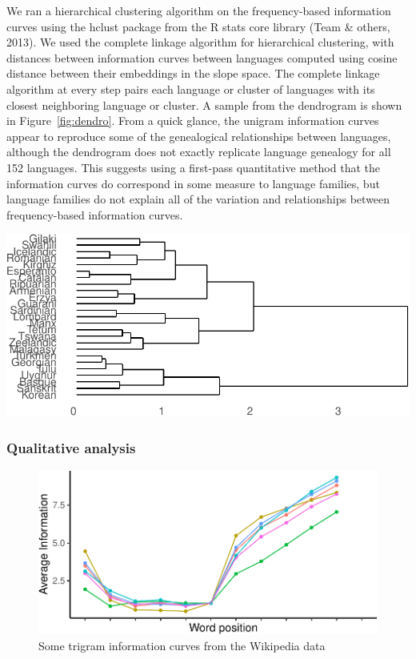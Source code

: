 \documentclass[man,floatsintext]{apa6}
\begin{document}
We ran a hierarchical clustering algorithm on the frequency-based information curves using the hclust package from the R stats core library (Team \& others, 2013). We used the complete linkage algorithm for hierarchical clustering, with distances between information curves between languages computed using cosine distance between their embeddings in the slope space. The complete linkage algorithm at every step pairs each language or cluster of languages with its closest neighboring language or cluster. A sample from the dendrogram is shown in Figure~\ref{fig:dendro}. From a quick glance, the unigram information curves appear to reproduce some of the genealogical relationships between languages, although the dendrogram does not exactly replicate language genealogy for all 152 languages. This suggests using a first-pass quantitative method that the information curves do correspond in some measure to language families, but language families do not explain all of the variation and relationships between frequency-based information curves.

\includegraphics{figs/dendro-1.pdf}

\hypertarget{qualitative-analysis}{%
\subsubsection{Qualitative analysis}\label{qualitative-analysis}}

\begin{figure}
\centering
\includegraphics{figs/wiki-trigrams-1.pdf}
\caption{\label{fig:wiki-trigrams}Some trigram information curves from the Wikipedia data}
\end{figure}
\end{document}

